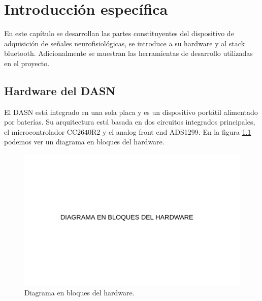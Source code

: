 \chapter{Introducción específica} %

\label{Chapter2}

En este capítulo se desarrollan las partes constituyentes del dispositivo de adquisición de señales neurofisiológicas, se introduce a su hardware y al stack bluetooth. Adicionalmente se muestran las herramientas de desarrollo utilizadas en el proyecto.

\section{Hardware del DASN}
\label{sec:ejemplo}
El DASN está integrado en una sola placa y es un dispositivo portátil alimentado por baterías. Su arquitectura está basada en dos circuitos integrados principales, el microcontrolador CC2640R2 y el analog front end ADS1299. En la figura \ref{fig:diagBloquesHardware} podemos ver un diagrama en bloques del hardware.

\vspace{1cm}

\begin{figure}[htbp]
	\centering
	\includegraphics[width=1\textwidth]{./Figures/DiagramaEnBloquesHardware.png}
	\caption{Diagrama en bloques del hardware.}
	\label{fig:diagBloquesHardware}
\end{figure}

\vspace{1cm}

